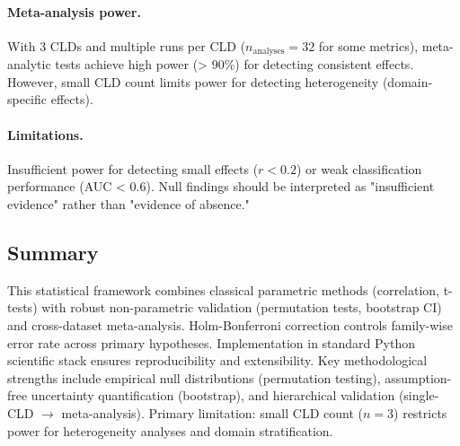 \paragraph{Meta-analysis power.} With 3 CLDs and multiple runs per CLD (\(n_{\text{analyses}} = 32\) for some metrics), meta-analytic tests achieve high power (> 90\%) for detecting consistent effects. However, small CLD count limits power for detecting heterogeneity (domain-specific effects).

\paragraph{Limitations.} Insufficient power for detecting small effects (\(r < 0.2\)) or weak classification performance (AUC < 0.6). Null findings should be interpreted as "insufficient evidence" rather than "evidence of absence."

\subsection{Summary}

This statistical framework combines classical parametric methods (correlation, t-tests) with robust non-parametric validation (permutation tests, bootstrap CI) and cross-dataset meta-analysis. Holm-Bonferroni correction controls family-wise error rate across primary hypotheses. Implementation in standard Python scientific stack ensures reproducibility and extensibility. Key methodological strengths include empirical null distributions (permutation testing), assumption-free uncertainty quantification (bootstrap), and hierarchical validation (single-CLD \(\rightarrow\) meta-analysis). Primary limitation: small CLD count (\(n=3\)) restricts power for heterogeneity analyses and domain stratification.
